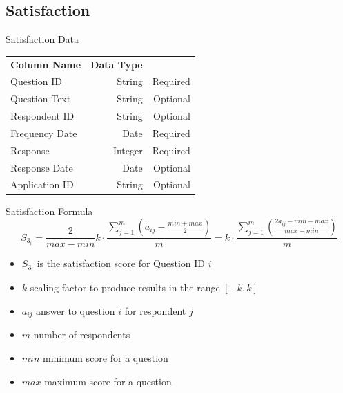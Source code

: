     \subsection{Satisfaction}
        \begin{frame}{Satisfaction Data}
            \centering
            \begin{tabular}{l | r | r}
                {\bfseries Column Name}
                 & {\bfseries Data Type}
                 &  \\
                
                Question ID & String  & Required \\
                \myrowcolour%
                Question Text & String  & Optional \\
                Respondent ID & String & Optional \\
                \myrowcolour%
                Frequency Date & Date & Required \\
                Response & Integer & Required \\
                \myrowcolour%
                Response Date & Date & Optional \\
                Application ID & String & Optional \\
            \end{tabular}
        \end{frame} 
        \begin{frame}{Satisfaction Formula }
            \[
                S_{3_i} =  \frac{2}{max-min}k \cdot \frac{ \sum^m_{j=1}(a_{ij}-\frac{min + max}{2})}{m} = k \cdot \frac{ \sum^m_{j=1}(\frac{2a_{ij}-min-max}{max-min})}{m}
            \]
            
            \begin{itemize}
                \item $S_{3_i}$ is the satisfaction score for Question ID $i$
                \item $k$ scaling factor to produce results in the range $[-k,k]$
                \item $a_{ij}$ answer to question $i$ for respondent $j$
                \item $m$ number of respondents
                \item $min$ minimum score for a question
                \item $max$ maximum score for a question
            \end{itemize}
        \end{frame} 
